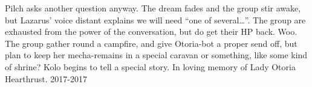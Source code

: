 Pilch asks another question anyway. The dream fades and the group stir awake, but Lazarus’ voice distant explains we will need “one of several…”.\medskip
The group are exhausted from the power of the conversation, but do get their HP back. Woo.\medskip
The group gather round a campfire, and give Otoria-bot a proper send off, but plan to keep her mecha-remains in a special caravan or something, like some kind of shrine?\medskip
Kolo begins to tell a special story.\medskip
In loving memory of Lady Otoria Hearthrust. 2017-2017